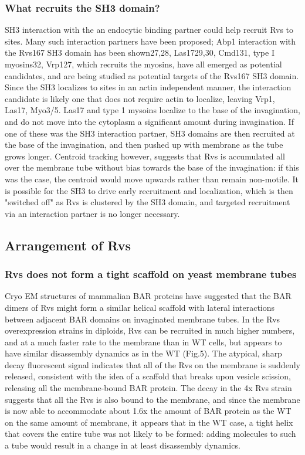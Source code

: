 \subsubsection{What recruits the SH3 domain?}
SH3 interaction with the an endocytic binding partner could help recruit Rvs to sites. Many such interaction partners have been proposed; Abp1 interaction with the Rvs167 SH3 domain has been shown27,28, Las1729,30, Cmd131, type I myosins32, Vrp127, which recruits the myosins, have all emerged as potential candidates, and are being studied as potential targets of the Rvs167 SH3 domain. Since the SH3 localizes to sites in an actin independent manner, the interaction candidate is likely one that does not require actin to localize, leaving Vrp1, Las17, Myo3/5. Las17 and type 1 mysoins localize to the base of the invagination, and do not move into the cytoplasm a significant amount during invagination. If one of these was the SH3 interaction partner, SH3 domains are then recruited at the base of the invagination, and then pushed up with membrane as the tube grows longer. Centroid tracking however, suggests that Rvs is accumulated all over the membrane tube without bias towards the base of the invagination: if this was the case, the centroid would move upwards rather than remain non-motile. It is possible for the SH3 to drive early recruitment and localization, which is then "switched off" as Rvs is clustered by the SH3 domain, and targeted recruitment via an interaction partner is no longer necessary. 

\subsection{Arrangement of Rvs}

\subsubsection{Rvs does not form a tight scaffold on yeast membrane tubes}
Cryo EM structures of mammalian BAR proteins have suggested that the BAR dimers of Rvs might form a similar helical scaffold with lateral interactions between adjacent BAR domains on invaginated membrane tubes. In the Rvs overexpression strains in diploids, Rvs can be recruited in much higher numbers, and at a much faster rate to the membrane than in WT cells, but appears to have similar disassembly dynamics as in the WT (Fig.5). The atypical, sharp decay fluorescent signal indicates that all of the Rvs on the membrane is suddenly released, consistent with the idea of a scaffold that breaks upon vesicle scission, releasing all the membrane-bound BAR protein. The decay in the 4x Rvs strain suggests that all the Rvs is also bound to the membrane, and since the membrane is now able to accommodate about 1.6x the amount of BAR protein as the WT on the same amount of membrane, it appears that in the WT case, a tight helix that covers the entire tube was not likely to be formed: adding molecules to such a tube would result in a change in at least disassembly dynamics.


